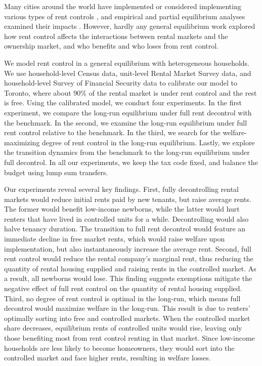 \documentclass[parskip=full]{article}
\begin{document}
Many cities around the world have implemented or considered implementing various types of rent controls \citep{fraser-1981}, and empirical and partial equilibrium analyses examined their impacts \citep{hayek-1929,fs-1946,fallis-1985,diamond-2019}. However, hardly any general equilibrium work explored how rent control affects the interactions between rental markets and the ownership market, and who benefits and who loses from rent control. 

We model rent control in a general equilibrium with heterogeneous households. We use household-level Census data, unit-level Rental Market Survey data, and household-level Survey of Financial Security data to calibrate our model to Toronto, where about 90\% of the rental market is under rent control and the rest is free. Using the calibrated model, we conduct four experiments. In the first experiment, we compare the long-run equilibrium under full rent decontrol with the benchmark. In the second, we examine the long-run equilibrium under full rent control relative to the benchmark. In the third, we search for the welfare-maximizing degree of rent control in the long-run equilibrium. Lastly, we explore the transition dynamics from the benchmark to the long-run equilibrium under full decontrol. In all our experiments, we keep the tax code fixed, and balance the budget using lump sum transfers.

Our experiments reveal several key findings. First, fully decontrolling rental markets would reduce initial rents paid by new tenants, but raise average rents. The former would benefit low-income newborns, while the latter would hurt renters that have lived in controlled units for a while. Decontrolling would also halve tenancy duration. The transition to full rent decontrol would feature an immediate decline in free market rents, which would raise welfare upon implementation, but also instantaneously increase the average rent. Second, full rent control would reduce the rental company's marginal rent, thus reducing the quantity of rental housing supplied and raising rents in the controlled market. As a result, all newborns would lose. This finding suggests exemptions mitigate the negative effect of full rent control on the quantity of rental housing supplied. Third, no degree of rent control is optimal in the long-run, which means full decontrol would maximize welfare in the long-run. This result is due to renters' optimally sorting into free and controlled markets. When the controlled market share decreases, equilibrium rents of controlled units would rise, leaving only those benefiting most from rent control renting in that market. Since low-income households are less likely to become homeowners, they would sort into the controlled market and face higher rents, resulting in welfare losses. 
\end{document}
